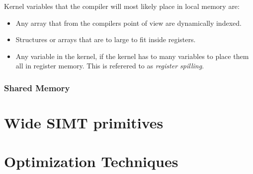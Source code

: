 Kernel variables that the compiler will most likely place in local memory are:

\begin{itemize}
  \item Any array that from the compilers point of view are dynamically indexed.
  \item Structures or arrays that are to large to fit inside registers.
  \item Any variable in the kernel, if the kernel has to many
    variables to place them all in register memory. This is referered
    to as \textit{register spilling}.
\end{itemize}


\subsubsection{Shared Memory}












\section{Wide SIMT primitives}






\section{Optimization Techniques}

